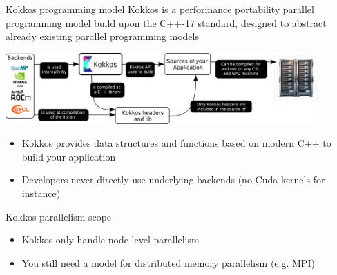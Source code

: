 \documentclass[
    aspectratio=169,
    handout,
]{beamer}
\begin{document}
\begin{frame}{Kokkos programming model}
    Kokkos is a performance portability parallel programming model build upon the C++-17 standard, designed to abstract already existing parallel programming models

    \vspace{0.5em}

    \begin{center}
        \includegraphics[width=0.9\textwidth]{kokkos_model.png}
    \end{center}
    \begin{itemize}
        \item Kokkos provides data structures and functions based on modern C++ to build your application
        \item Developers never directly use underlying backends (no Cuda kernels for instance)
    \end{itemize}
\end{frame}


\begin{frame}{Kokkos parallelism scope}
    \begin{itemize}
        \item Kokkos only handle node-level parallelism
        \item You still need a model for distributed memory parallelism (e.g. MPI)
    \end{itemize}
\end{frame}

\end{document}
